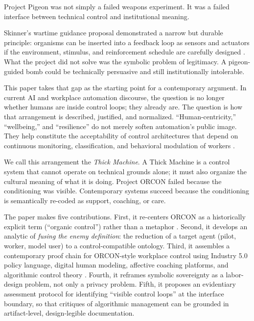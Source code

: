 \documentclass[runningheads]{llncs}
\begin{document}
Project Pigeon was not simply a failed weapons experiment. It was a failed interface between technical control and institutional meaning.

Skinner's wartime guidance proposal demonstrated a narrow but durable principle: organisms can be inserted into a feedback loop as sensors and actuators if the environment, stimulus, and reinforcement schedule are carefully designed \cite{skinner1960pigeons,capshew1993engineering}. What the project did not solve was the symbolic problem of legitimacy. A pigeon-guided bomb could be technically persuasive and still institutionally intolerable.

This paper takes that gap as the starting point for a contemporary argument. In current AI and workplace automation discourse, the question is no longer whether humans are inside control loops; they already are. The question is how that arrangement is described, justified, and normalized. ``Human-centricity,'' ``wellbeing,'' and ``resilience'' do not merely soften automation's public image. They help constitute the acceptability of control architectures that depend on continuous monitoring, classification, and behavioral modulation of workers \cite{breque2021industry,kellogg2020algorithms}.

We call this arrangement the \emph{Thick Machine}. A Thick Machine is a control system that cannot operate on technical grounds alone; it must also organize the cultural meaning of what it is doing. Project ORCON failed because the conditioning was visible. Contemporary systems succeed because the conditioning is semantically re-coded as support, coaching, or care.

The paper makes five contributions. First, it re-centers ORCON as a historically explicit term (``organic control'') rather than a metaphor \cite{skinner1960pigeons}. Second, it develops an analytic of \emph{fusing the enemy definition}: the reduction of a target agent (pilot, worker, model user) to a control-compatible ontology. Third, it assembles a contemporary proof chain for ORCON-style workplace control using Industry 5.0 policy language, digital human modeling, affective coaching platforms, and algorithmic control theory \cite{breque2021industry,siemensPSXHuman,siemensHumanAdvanced,cxtoday2022cogito,kellogg2020algorithms}. Fourth, it reframes symbolic sovereignty as a labor-design problem, not only a privacy problem. Fifth, it proposes an evidentiary assessment protocol for identifying ``visible control loops'' at the interface boundary, so that critiques of algorithmic management can be grounded in artifact-level, design-legible documentation.
\end{document}
